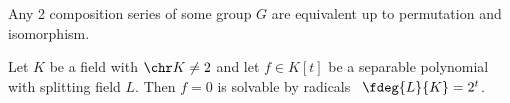 \documentclass[a4paper]{article}
\begin{document}
\begin{ttheorem}
  Any 2 composition series of some group \( G \) are equivalent up to permutation and isomorphism.
\end{ttheorem}

\begin{ttheorem}
  Let \( K \) be a field with \( \chr K \neq 2 \) and let \( f\in K[t] \) be a separable polynomial with splitting field \( L \).
  Then \( f=0 \) is solvable by  radicals \iff~\( \fdeg{L}{K}=2^t \).
\end{ttheorem}
\end{document}
